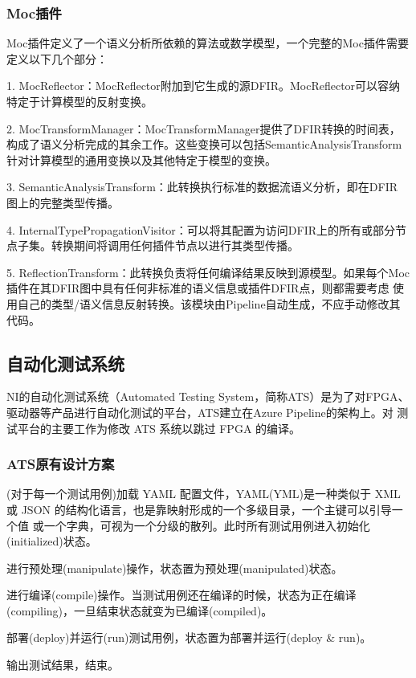 \documentclass[UTF8]{ctexart}
\begin{document}
\subsubsection{Moc插件}
Moc插件定义了一个语义分析所依赖的算法或数学模型，一个完整的Moc插件需要定义以下几个部分：
\par
1. MocReflector：MocReflector附加到它生成的源DFIR。MocReflector可以容纳特定于计算模型的反射变换。
\par
2. MocTransformManager：MocTransformManager提供了DFIR转换的时间表，构成了语义分析完成的其余工作。这些变换可以包括SemanticAnalysisTransform
针对计算模型的通用变换以及其他特定于模型的变换。
\par
3. SemanticAnalysisTransform：此转换执行标准的数据流语义分析，即在DFIR 图上的完整类型传播。
\par
4. InternalTypePropagationVisitor：可以将其配置为访问DFIR上的所有或部分节点子集。转换期间将调用任何插件节点以进行其类型传播。
\par
5. ReflectionTransform：此转换负责将任何编译结果反映到源模型。如果每个Moc插件在其DFIR图中具有任何非标准的语义信息或插件DFIR点，则都需要考虑
使用自己的类型/语义信息反射转换。该模块由Pipeline自动生成，不应手动修改其代码。
\par

\subsection{自动化测试系统}
NI的自动化测试系统（Automated Testing System，简称ATS）是为了对FPGA、驱动器等产品进行自动化测试的平台，ATS建立在Azure Pipeline的架构上。对
测试平台的主要工作为修改 ATS 系统以跳过 FPGA 的编译。
\subsubsection{ATS原有设计方案}
(对于每一个测试用例)加载 YAML 配置文件，YAML(YML)是一种类似于 XML或 JSON 的结构化语言，也是靠映射形成的一个多级目录，一个主键可以引导一个值
或一个字典，可视为一个分级的散列。此时所有测试用例进入初始化(initialized)状态。
\par
进行预处理(manipulate)操作，状态置为预处理(manipulated)状态。
\par
进行编译(compile)操作。当测试用例还在编译的时候，状态为正在编译 (compiling)，一旦结束状态就变为已编译(compiled)。
\par
部署(deploy)并运行(run)测试用例，状态置为部署并运行(deploy \& run)。
\par
输出测试结果，结束。
\end{document}
